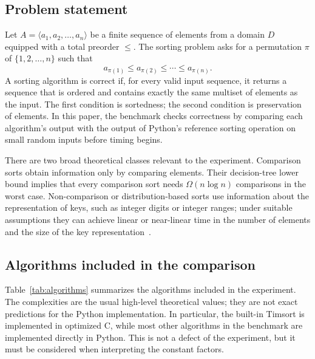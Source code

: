 \documentclass[11pt,a4paper]{article}
\begin{document}
\subsection{Problem statement}

Let $A=\langle a_1,a_2,\ldots,a_n\rangle$ be a finite sequence of elements from a domain $D$ equipped with a total preorder $\leq$. The sorting problem asks for a permutation $\pi$ of $\{1,2,\ldots,n\}$ such that
\[
 a_{\pi(1)} \leq a_{\pi(2)} \leq \cdots \leq a_{\pi(n)}.
\]
A sorting algorithm is correct if, for every valid input sequence, it returns a sequence that is ordered and contains exactly the same multiset of elements as the input. The first condition is sortedness; the second condition is preservation of elements. In this paper, the benchmark checks correctness by comparing each algorithm's output with the output of Python's reference sorting operation on small random inputs before timing begins.

There are two broad theoretical classes relevant to the experiment. Comparison sorts obtain information only by comparing elements. Their decision-tree lower bound implies that every comparison sort needs $\Omega(n\log n)$ comparisons in the worst case. Non-comparison or distribution-based sorts use information about the representation of keys, such as integer digits or integer ranges; under suitable assumptions they can achieve linear or near-linear time in the number of elements and the size of the key representation~\cite{cormen2009,knuth1998}.

\subsection{Algorithms included in the comparison}

Table~\ref{tab:algorithms} summarizes the algorithms included in the experiment. The complexities are the usual high-level theoretical values; they are not exact predictions for the Python implementation. In particular, the built-in Timsort is implemented in optimized C, while most other algorithms in the benchmark are implemented directly in Python. This is not a defect of the experiment, but it must be considered when interpreting the constant factors.
\end{document}
